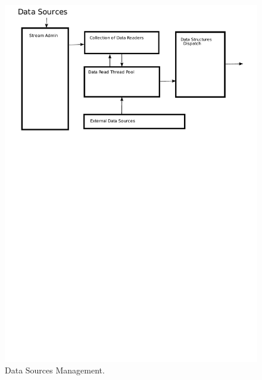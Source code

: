 \documentclass[14pt]{article}
\begin{document}


\begin{figure}
  \includegraphics[width=5.00in]{../figures/DataSources.pdf}
  \caption{Data Sources Management.}
  \label{DataSourcePic}
\end{figure}
\end{document}
